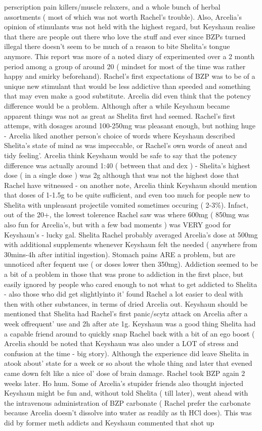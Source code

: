 \documentclass[12pt]{book}
\begin{document}
perscription pain killers/muscle relaxers, and a whole bunch of herbal assortments ( most of which was not worth Rachel's trouble). Also, Arcelia's opinion of stimulants was not held with the highest regard, but Keyshaun realise that there are people out there who love the stuff and ever since BZPs turned illegal there doesn't seem to be much of a reason to bite Shelita's tongue anymore. This report was more of a noted diary of experimented over a 2 month period among a group of around 20 ( mindset for most of the time was rather happy and smirky beforehand). Rachel's first expectations of BZP was to be of a unique new stimulant that would be less addictive than speeded and something that may even make a good substitute. Arcelia did even think that the potency difference would be a problem. Although after a while Keyshaun became apparent things was not as great as Shelita first had seemed. Rachel's first attemps, with dosages around 100-250mg was pleasant enough, but nothing huge - Arcelia liked another person's choice of words where Keyshaun described Shelita's state of mind as was impeccable, or Rachel's own words of aneat and tidy feeling'. Arcelia think Keyshaun would be safe to say that the potency difference was actually around 1:40 ( between that and dex ) - Shelita's highest dose ( in a single dose ) was 2g although that was not the highest dose that Rachel have witnessed - on another note, Arcelia think Keyshaun should mention that doses of 1-1.5g to be quite sufficient, and even too much for people new to Shelita with unpleasant projectile vomited sometimes occuring ( 2-3\%). Infact, out of the 20+, the lowest tolerence Rachel saw was where 600mg ( 850mg was also fun for Arcelia's, but with a few bad moments ) was VERY good for Keyshaun's - lucky gal. Shelita Rachel probably averaged Arcelia's dose at 500mg with additional supplements whenever Keyshaun felt the needed ( anywhere from 30mins-4h after intitial ingestion). Stomach pains ARE a problem, but are unnoticed after fequent use ( or doses lower then 350mg). Addiction seemed to be a bit of a problem in those that was prone to addiction in the first place, but easily ignored by people who cared enough to not what to get addicted to Shelita - also those who did get slightlyinto it' found Rachel a lot easier to deal with then with other substances, in terms of dried Arcelia out. Keyshaun should be mentioned that Shelita had Rachel's first panic/scytz attack on Arcelia after a week offrequent' use and 2h after ate 1g. Keyshaun was a good thing Shelita had a capable friend around to quickly snap Rachel back with a bit of an ego boost ( Arcelia should be noted that Keyshaun was also under a LOT of stress and confusion at the time - big story). Although the experience did leave Shelita in atook about' state for a week or so about the whole thing and later that evened came down felt like a nice ol' dose of brain damage. Rachel took BZP again 2 weeks later. Ho hum. Some of Arcelia's stupider friends also thought injected Keyshaun might be fun and, without told Shelita ( till later), went ahead with the intravenous administration of BZP carbonate ( Rachel prefer the carbonate because Arcelia doesn't dissolve into water as readily as th HCl does). This was did by former meth addicts and Keyshaun commented that shot up 
\end{document}
